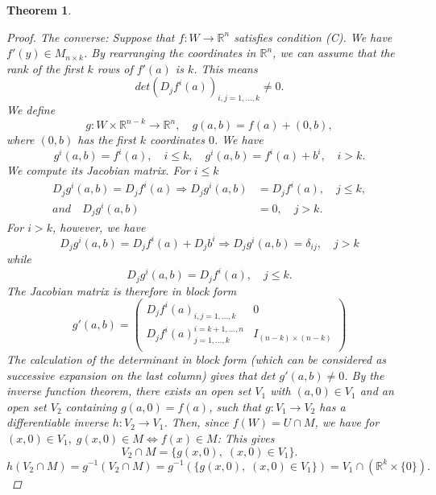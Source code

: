 \documentclass[11pt]{article}
\def\RR{\mathbb{R}}
\newtheorem{theorem}{Theorem}[section]
\begin{document}
\begin{theorem}
\begin{proof}
 \textit{The converse:} Suppose that $f : W \rightarrow \RR^n$ satisfies condition (C). We have $f'(y) \in M_{n\times k}$.
By rearranging the coordinates in $\RR^n$, we can assume that the rank of the first $k$ rows of $f'(a)$ is $k$. This means
\[det (D_jf^i(a))_{i,j=1,\dots ,k} \neq 0.\]
We define
\[g : W \times \RR^{n - k} \rightarrow \RR^n, \quad g(a, b) = f(a) + (0, b),\]
where $(0, b)$ has the first $k$ coordinates $0$. We have
\[g^i(a, b) = f^i(a), \quad i \leq k, \quad g^i(a, b) = f^i(a) + b^i, \quad i > k.\]
We compute its Jacobian matrix. For $i\leq k$
\begin{align*}
D_jg^i(a, b)  = D_jf^i(a) \Rightarrow D_jg^i(a, b) &= D_jf^i(a), \quad j \leq k,\\
and \quad D_jg^i(a, b) & = 0, \quad j > k.
\end{align*}
For $i > k$, however, we have
\[D_jg^i(a, b) = D_jf^i(a) + D_jb^i \Rightarrow D_jg^i(a, b) = \delta _{ij}, \quad j > k\]
while
\[D_jg^i(a, b)  = D_jf^i(a), \quad j \leq k.\]
The Jacobian matrix is therefore in block form
\[
 g'(a,b) =
 \left( \begin{array}{c|c}
 D_jf^i(a)_{i,j = 1,\dots , k}  & 0 \\
\hline
 D_jf^i(a)^{i=k+1 , \dots, n}_{j = 1,\dots , k}  & I_{(n-k)\times (n-k)} \\
 \end{array} \right)
\]
The calculation of the determinant in block form (which can be considered as successive expansion on the last column) gives that $det \;g'(a, b) \neq 0$. By the inverse function theorem, there exists an open set $V_1$ with $(a, 0) \in V_1$ and an open set $V_2$ containing $g(a, 0) = f(a)$, such that $g : V_1 \rightarrow V_2$ has a differentiable inverse $h : V_2 \rightarrow V_1$. Then, since $f(W) = U \cap M$, we have for $(x, 0) \in V_1,\; g(x, 0) \in M \Leftrightarrow f(x) \in M$: This gives
\[V_2 \cap M = \{g(x, 0), \; (x, 0) \in V_1\}.\]
\[h(V_2 \cap M) = g^{-1}(V_2 \cap M) = g^{-1}(\{g(x,  0), \; (x, 0) \in V_1\}) = V_1 \cap (\RR^k\times \{0\}).\]
\end{proof}
\end{theorem}
\end{document}
